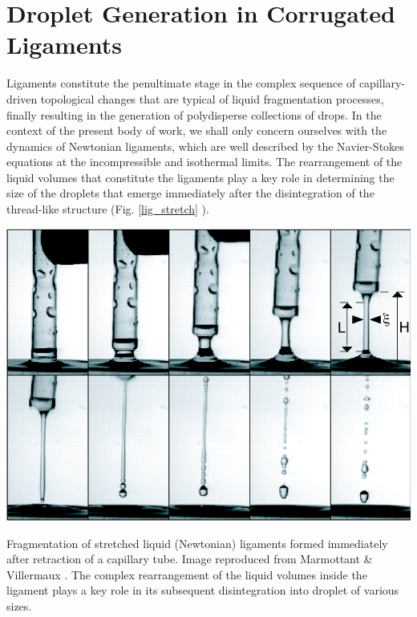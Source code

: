 \setchapterpreamble[u]{\margintoc}

\chapter{Droplet Generation in Corrugated Ligaments}

Ligaments constitute the penultimate stage in the complex sequence 
of capillary-driven topological changes that are 
typical of liquid fragmentation processes, 
finally resulting in the generation of polydisperse collections of drops. 
In the context of the present body of work, we shall 
only concern ourselves with the dynamics of Newtonian ligaments, 
which are well described by the Navier-Stokes equations 
at the incompressible and isothermal limits. 
The rearrangement of the liquid volumes that constitute
the ligaments play a key role in determining the size 
of the droplets that emerge immediately after the disintegration
of the thread-like structure (Fig. \ref{lig_stretch} ).  

\begin{marginfigure}[3cm]
\centering
\includegraphics{plots/ligament_breakup/lig_mar_vill_pof04.png}
\caption{Fragmentation of stretched liquid (Newtonian) ligaments formed 
	immediately after retraction of a capillary tube. 
	Image reproduced from Marmottant \& Villermaux \cite{vill_3}.
       	The complex rearrangement of the liquid volumes 
	inside the ligament plays a key role in its subsequent 
	disintegration into droplet of various sizes. 
	}
\label{lig_stretch}
\end{marginfigure}

